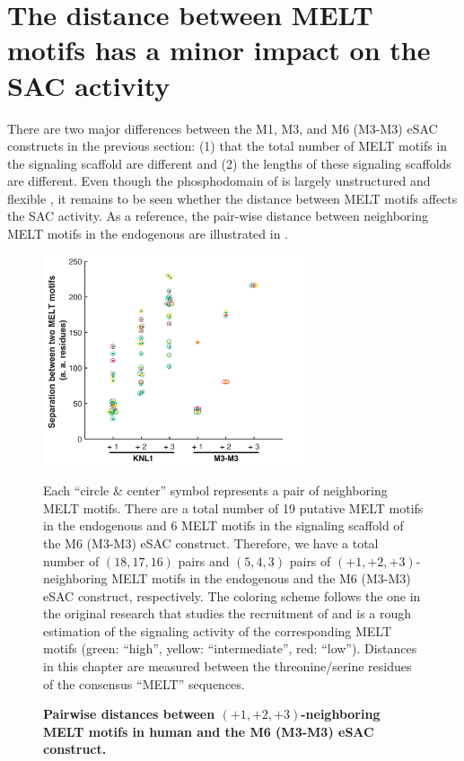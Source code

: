 \section{The distance between MELT motifs has a minor impact on the SAC activity}
There are two major differences between the M1, M3, and M6 (M3-M3) eSAC constructs in the previous section: (1) that the total number of MELT motifs in the signaling scaffold are different and (2) the lengths of these signaling scaffolds are different. Even though the phosphodomain of  is largely unstructured and flexible \cite{UnstructuredKNL1}, it remains to be seen whether the distance between MELT motifs affects the SAC activity. As a reference, the pair-wise distance between neighboring MELT motifs in the endogenous  are illustrated in .

\begin{figure}
    \centering
    \includegraphics[width=0.7\textwidth]{chapters/figures/MELTSeparationColorCodedBeeSwarmPlot.pdf}
    \caption{\textbf{Pairwise distances between $(+1, +2, +3)$-neighboring MELT motifs in human  and the M6 (M3-M3) eSAC construct.}}
    \noindent\justifying Each ``circle \& center'' symbol represents a pair of neighboring MELT motifs. There are a total number of 19 putative MELT motifs in the endogenous  and 6 MELT motifs in the signaling scaffold of the M6 (M3-M3) eSAC construct. Therefore, we have a total number of $(18, 17, 16)$ pairs and $(5, 4, 3)$ pairs of $(+1, +2, +3)$-neighboring MELT motifs in the endogenous  and the M6 (M3-M3) eSAC construct, respectively. The coloring scheme follows the one in the original research \cite{MELTActivity} that studies the recruitment of  and is a rough estimation of the signaling activity of the corresponding MELT motifs (green: ``high'', yellow: ``intermediate'', red: ``low''). Distances in this chapter are measured between the threonine/serine residues of the consensus ``MELT'' sequences.
    \label{PairwiseDistancesBetweenNeighboringMELTs}
\end{figure}

